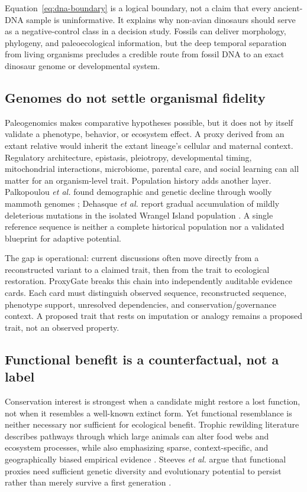 \documentclass[conference]{IEEEtran}
\begin{document}
Equation~\eqref{eq:dna-boundary} is a logical boundary, not a claim that every ancient-DNA sample is uninformative. It explains why non-avian dinosaurs should serve as a negative-control class in a decision study. Fossils can deliver morphology, phylogeny, and paleoecological information, but the deep temporal separation from living organisms precludes a credible route from fossil DNA to an exact dinosaur genome or developmental system.

\subsection{Genomes do not settle organismal fidelity}

Paleogenomics makes comparative hypotheses possible, but it does not by itself validate a phenotype, behavior, or ecosystem effect. A proxy derived from an extant relative would inherit the extant lineage's cellular and maternal context. Regulatory architecture, epistasis, pleiotropy, developmental timing, mitochondrial interactions, microbiome, parental care, and social learning can all matter for an organism-level trait. Population history adds another layer. Palkopoulou \emph{et al.} found demographic and genetic decline through woolly mammoth genomes \cite{palkopoulou2015}; Dehasque \emph{et al.} report gradual accumulation of mildly deleterious mutations in the isolated Wrangel Island population \cite{dehasque2024}. A single reference sequence is neither a complete historical population nor a validated blueprint for adaptive potential.

The gap is operational: current discussions often move directly from a reconstructed variant to a claimed trait, then from the trait to ecological restoration. ProxyGate breaks this chain into independently auditable evidence cards. Each card must distinguish observed sequence, reconstructed sequence, phenotype support, unresolved dependencies, and conservation/governance context. A proposed trait that rests on imputation or analogy remains a proposed trait, not an observed property.

\subsection{Functional benefit is a counterfactual, not a label}

Conservation interest is strongest when a candidate might restore a lost function, not when it resembles a well-known extinct form. Yet functional resemblance is neither necessary nor sufficient for ecological benefit. Trophic rewilding literature describes pathways through which large animals can alter food webs and ecosystem processes, while also emphasizing sparse, context-specific, and geographically biased empirical evidence \cite{svenning2016}. Steeves \emph{et al.} argue that functional proxies need sufficient genetic diversity and evolutionary potential to persist rather than merely survive a first generation \cite{steeves2017}.
\end{document}
